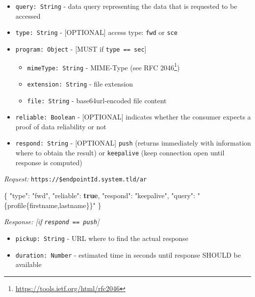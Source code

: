 \documentclass[12pt,english,a4paper,titlepage,cleardoublepage=empty,dottedtoc]{report}
\newenvironment{Shaded}{\begin{snugshade}}{\end{snugshade}}
\newcommand{\KeywordTok}[1]{\textcolor[rgb]{0.13,0.29,0.53}{\textbf{#1}}}
\newcommand{\DataTypeTok}[1]{\textcolor[rgb]{0.13,0.29,0.53}{#1}}
\newcommand{\StringTok}[1]{\textcolor[rgb]{0.31,0.60,0.02}{#1}}
\newcommand{\FunctionTok}[1]{\textcolor[rgb]{0.00,0.00,0.00}{#1}}
\renewcommand{\href}[2]{#2\footnote{\url{#1}}}
\providecommand{\tightlist}{%
  \setlength{\itemsep}{0pt}\setlength{\parskip}{0pt}}
\begin{document}
\begin{itemize}
\tightlist
\item
  \texttt{query:\ String} - data query representing the data that is
  requested to be accessed
\item
  \texttt{type:\ String} - {[}OPTIONAL{]} access type: \texttt{fwd} or
  \texttt{sce}
\item
  \texttt{program:\ Object} - {[}MUST if
  \texttt{type\ ==\ \textquotesingle{}sec\textquotesingle{}}{]}

  \begin{itemize}
  \tightlist
  \item
    \texttt{mimeType:\ String} - MIME-Type (see
    \href{https://tools.ietf.org/html/rfc2046}{RFC 2046})
  \item
    \texttt{extension:\ String} - file extension
  \item
    \texttt{file:\ String} - base64url-encoded file content
  \end{itemize}
\item
  \texttt{reliable:\ Boolean} - {[}OPTIONAL{]} indicates whether the
  consumer expects a proof of data reliability or not
\item
  \texttt{respond:\ String} - {[}OPTIONAL{]} \texttt{push} (returns
  immediately with information where to obtain the result) or
  \texttt{keepalive} (keep connection open until response is computed)
\end{itemize}

\emph{Request:} \texttt{https://\$endpointId.system.tld/ar}

\begin{Shaded}
\begin{Highlighting}[numbers=left,,]
\FunctionTok{\{}
    \DataTypeTok{"type"}\FunctionTok{:} \StringTok{"fwd"}\FunctionTok{,}
    \DataTypeTok{"reliable"}\FunctionTok{:} \KeywordTok{true}\FunctionTok{,}
    \DataTypeTok{"respond"}\FunctionTok{:} \StringTok{"keepalive"}\FunctionTok{,}
    \DataTypeTok{"query"}\FunctionTok{:} \StringTok{"\{profile\{firstname,lastname\}\}"}
\FunctionTok{\}}
\end{Highlighting}
\end{Shaded}

\emph{Response: {[}if
\texttt{respond\ ==\ \textquotesingle{}push\textquotesingle{}}{]}}

\begin{itemize}
\tightlist
\item
  \texttt{pickup:\ String} - URL where to find the actual response
\item
  \texttt{duration:\ Number} - estimated time in seconds until response
  SHOULD be available
\end{itemize}
\end{document}
